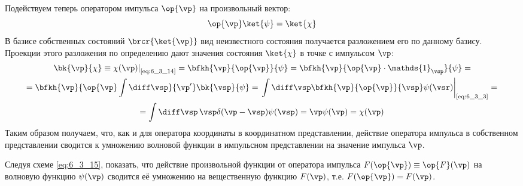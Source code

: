 Подействуем теперь оператором импульса $\op{\vp}$ на произвольный вектор:
\begin{equation}
\label{eq:6_3_14}
\op{\vp} \ket{\psi} = \ket{\chi}
\end{equation}%
%
В базисе собственных состояний $\brcr{\ket{\vp}}$ вид неизвестного состояния получается разложением его по данному базису. Проекции этого разложения по определению дают значения состояния $\ket{\chi}$ в точке с импульсом $\vp$:%
%
\begin{equation}
\label{eq:6_3_15}
\begin{gathered}
	\left.\bk{\vp}{\chi} \equiv \chi(\vp)\right|_{\text{\eqref{eq:6_3_14}}} =
	\bfkh{\vp}{\op{\vp}}{\psi} = 
	\bfkh{\vp}{\op{\vp} \cdot \mathds{1}_{\vsp}}{\psi} = \\ =
	\bfkh{\vp}{\op{\vp}\int \diff\vsp}{\vp'} \bk{\vsp}{\psi} = 
	\left.\int \diff\vsp \bfkh{\vp}{\op{\vp}}{\vsp} \psi(\vsr) \right|_{\text{\eqref{eq:6_3_3}}} = \\ =
	\int \diff\vsp \, \vsp \delta(\vp - \vsp) \psi(\vsp) = \vp \psi(\vp) = \chi(\vp)
\end{gathered}
\end{equation}%
%
Таким образом получаем, что, как и для оператора координаты в координатном представлении, действие оператора импульса в собственном представлении сводится к умножению волновой функции в импульсном представлении на значение импульса $\vp$.

\begin{excr}
\label{excr2}
Следуя схеме \eqref{eq:6_3_15}, показать, что действие произвольной функции от оператора импульса $F(\op{\vp}) \equiv \op{F}(\vp)$ на волновую функцию $\psi(\vp)$ сводится её умножению на вещественную функцию $F(\vp)$, т.е. $F(\op{\vp})=F(\vp)$.
\end{excr}

